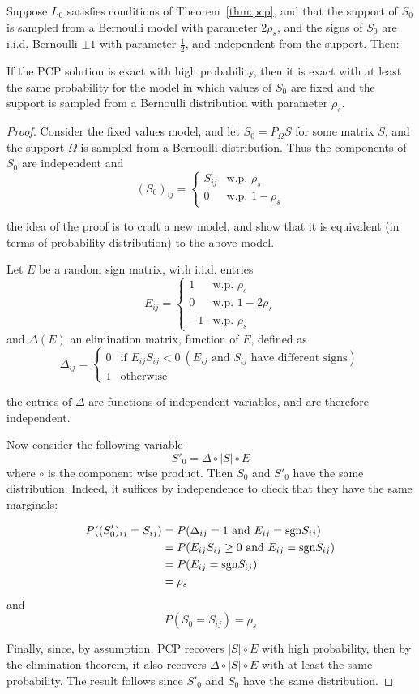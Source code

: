 \begin{theorem}
Suppose $L_0$ satisfies conditions of Theorem~\ref{thm:pcp}, and that the support of $S_0$ is sampled from a Bernoulli model with parameter $2\rho_s$, and the signs of $S_0$ are i.i.d. Bernoulli $\pm 1$ with parameter $\frac{1}{2}$, and independent from the support. Then:

If the PCP solution is exact with high probability, then it is exact with at least the same probability for the model in which values of $S_0$ are fixed and the support is sampled from a Bernoulli distribution with parameter $\rho_s$.
\end{theorem}

\begin{proof}
Consider the fixed values model, and let $S_0 = P_\Omega S$ for some matrix $S$, and the support $\Omega$ is sampled from a Bernoulli distribution. Thus the components of $S_0$ are independent and
\[
(S_0)_{ij} =
\begin{cases}
S_{ij} & \text{w.p. } \rho_s \\
0 & \text{w.p. } 1 - \rho_s
\end{cases}
\]

the idea of the proof is to craft a new model, and show that it is equivalent (in terms of probability distribution) to the above model.

Let $E$ be a random sign matrix, with i.i.d. entries
\[
E_{ij} =
\begin{cases}
1 & \text{w.p. } \rho_s \\
0 & \text{w.p. } 1 - 2\rho_s\\
-1 & \text{w.p. } \rho_s
\end{cases}
\]
and $\Delta(E)$ an elimination matrix, function of $E$, defined as
\[
\Delta_{ij} =
\begin{cases}
0 & \text{if } E_{ij}S_{ij} < 0 \ (E_{ij} \text{ and } S_{ij} \text{ have different signs} )\\
1 & \text{otherwise}
\end{cases}
\]

the entries of $\Delta$ are functions of independent variables, and are therefore independent.

Now consider the following variable
\[
S'_0 = \Delta \circ |S| \circ E
\]
where $\circ$ is the component wise product. Then $S_0$ and $S'_0$ have the same distribution. Indeed, it suffices by independence to check that they have the same marginals:

\begin{align*}
P((S'_0)_{ij} = S_{ij})
&= P(\Delta_{ij} = 1 \text{ and } E_{ij} = \text{sgn} S_{ij}) \\
&= P(E_{ij}S_{ij} \geq 0 \text{ and } E_{ij} = \text{sgn} S_{ij}) \\
&= P(E_{ij} = \text{sgn} S_{ij}) \\
&= \rho_s
\end{align*}
and
\[
P(S_0 = S_{ij}) = \rho_s
\]

Finally, since, by assumption, PCP recovers $|S| \circ E$ with high probability, then by the elimination theorem, it also recovers $\Delta \circ |S| \circ E$ with at least the same probability. The result follows since $S'_0$ and $S_0$ have the same distribution.
\end{proof}

